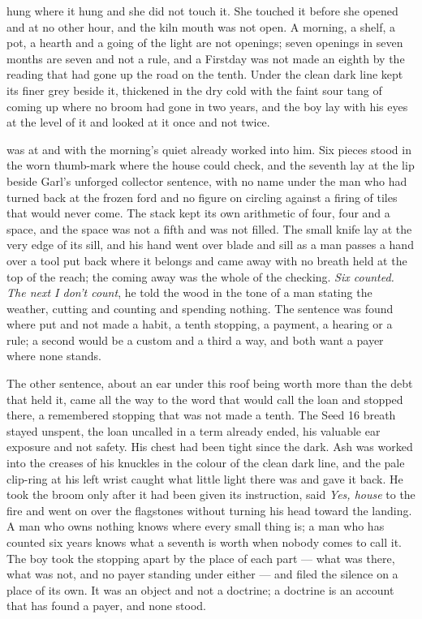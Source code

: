  hung where it hung and she did not touch it. She touched it before she opened  and at no other hour, and the kiln mouth was not open. A morning, a shelf, a pot, a hearth and a going of the light are not openings; seven openings in seven months are seven and not a rule, and a Firstday was not made an eighth by the reading that had gone up the road on the tenth. Under  the clean dark line kept its finer grey beside it, thickened in the dry cold with the faint sour tang of  coming up where no broom had gone in two years, and the boy lay with his eyes at the level of it and looked at it once and not twice.

\scenebreak

 was at  and  with the morning's quiet already worked into him. Six pieces stood in the worn thumb-mark where the house could check, and the seventh lay at the lip beside Garl's unforged collector sentence, with no name under the man who had turned back at the frozen ford and no figure on  circling against a firing of tiles that would never come. The stack kept its own arithmetic of four, four and a space, and the space was not a fifth and was not filled. The small knife lay at the very edge of its sill, and his hand went over blade and sill as a man passes a hand over a tool put back where it belongs and came away with no breath held at the top of the reach; the coming away was the whole of the checking. \emph{Six counted. The next I don't count}, he told the wood in the tone of a man stating the weather, cutting and counting and spending nothing. The sentence was found where put and not made a habit, a tenth stopping, a payment, a hearing or a rule; a second would be a custom and a third a way, and both want a payer where none stands.

The other sentence, about an ear under this roof being worth more than the debt that held it, came all the way to the word that would call the loan and stopped there, a remembered stopping that was not made a tenth. The Seed 16 breath stayed unspent, the loan uncalled in a term already ended, his valuable ear exposure and not safety. His chest had been tight since the dark. Ash was worked into the creases of his knuckles in the colour of the clean dark line, and the pale clip-ring at his left wrist caught what little light there was and gave it back. He took the broom only after it had been given its instruction, said \emph{Yes, house} to the fire and went on over the flagstones without turning his head toward the landing. A man who owns nothing knows where every small thing is; a man who has counted six years knows what a seventh is worth when nobody comes to call it. The boy took the stopping apart by the place of each part --- what was there, what was not, and no payer standing under either --- and filed the silence on a place of its own. It was an object and not a doctrine; a doctrine is an account that has found a payer, and none stood.

